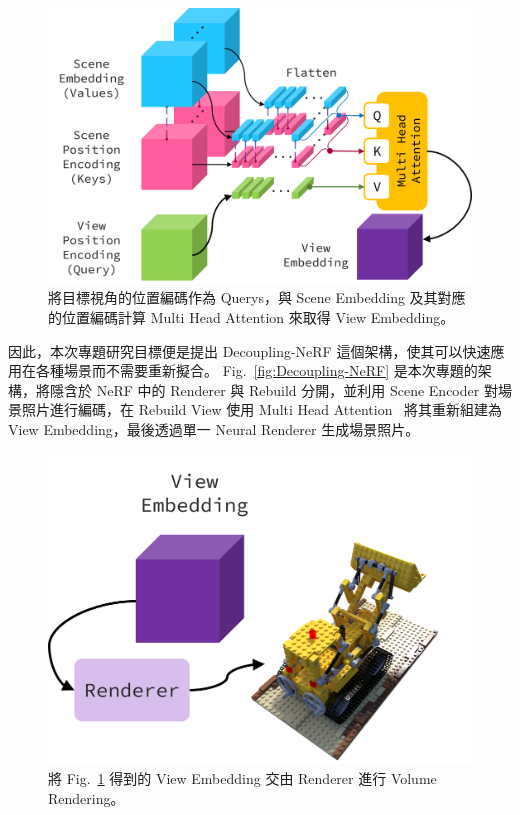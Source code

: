 \documentclass[10pt,twocolumn,letterpaper]{article}
\begin{document}
\begin{CJK}{UTF8}{bkai}
   \begin{figure}
      \begin{center}
         \includegraphics[width=1\linewidth]{img/rebuild-view.png}
      \end{center}
      \caption{
         將目標視角的位置編碼作為 Querys，與 Scene Embedding 及其對應的位置編碼計算
         Multi Head Attention 來取得 View Embedding。
      }
      \label{fig:rebuild-view}
   \end{figure}

   因此，本次專題研究目標便是提出 Decoupling-NeRF 這個架構，使其可以快速應用在各種場景而不需要重新擬合。
   Fig.~\ref{fig:Decoupling-NeRF} 是本次專題的架構，將隱含於 NeRF
   中的 Renderer 與 Rebuild 分開，並利用 Scene Encoder
   對場景照片進行編碼，在 Rebuild View 使用 Multi Head Attention~\cite{AttentionIsAllYouNeed}
   將其重新組建為 View Embedding，最後透過單一 Neural Renderer 生成場景照片。

   \begin{figure}[htbp]
      \begin{center}
         \includegraphics[width=1\linewidth]{img/render-view.png}
      \end{center}
      \caption{
         將 Fig.~\ref{fig:rebuild-view} 得到的 View Embedding 交由
         Renderer 進行 Volume Rendering。
      }
      \label{fig:render-view}
   \end{figure}


\end{CJK}
\end{document}
